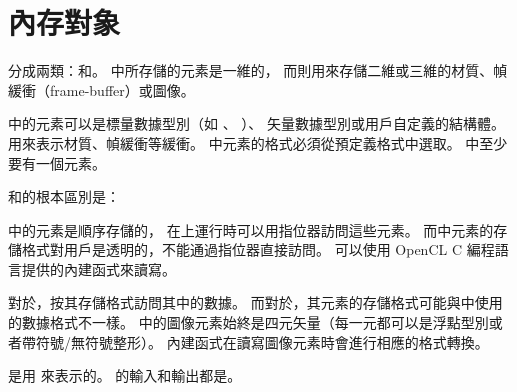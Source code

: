 \section{內存對象}

分成兩類：和。
中所存儲的元素是一維的，
而則用來存儲二維或三維的材質、幀緩衝（frame-buffer）或圖像。

中的元素可以是標量數據型別（如 、 ）、
矢量數據型別或用戶自定義的結構體。
用來表示材質、幀緩衝等緩衝。
中元素的格式必須從預定義格式中選取。
中至少要有一個元素。

和的根本區別是：
\startigBase
\item {}中的元素是順序存儲的，
在上運行時可以用指位器訪問這些元素。
而中元素的存儲格式對用戶是透明的，不能通過指位器直接訪問。
可以使用 OpenCL C 編程語言提供的內建函式來讀寫。

\item 對於，按其存儲格式訪問其中的數據。
而對於，其元素的存儲格式可能與中使用的數據格式不一樣。
中的圖像元素始終是四元矢量（每一元都可以是浮點型別或者帶符號/無符號整形）。
內建函式在讀寫圖像元素時會進行相應的格式轉換。
\stopigBase

是用  來表示的。
的輸入和輸出都是。


